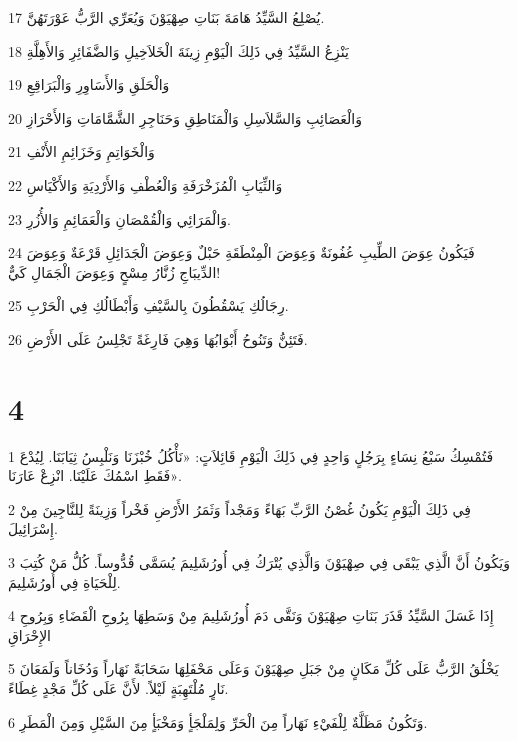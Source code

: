 \par 17 يُصْلِعُ السَّيِّدُ هَامَةَ بَنَاتِ صِهْيَوْنَ وَيُعَرِّي الرَّبُّ عَوْرَتَهُنَّ.
\par 18 يَنْزِعُ السَّيِّدُ فِي ذَلِكَ الْيَوْمِ زِينَةَ الْخَلاَخِيلِ وَالضَّفَائِرِ وَالأَهِلَّةِ
\par 19 وَالْحَلَقِ وَالأَسَاوِرِ وَالْبَرَاقِعِ
\par 20 وَالْعَصَائِبِ وَالسَّلاَسِلِ وَالْمَنَاطِقِ وَحَنَاجِرِ الشَّمَّامَاتِ وَالأَحْرَازِ
\par 21 وَالْخَوَاتِمِ وَخَزَائِمِ الأَنْفِ
\par 22 وَالثِّيَابِ الْمُزَخْرَفَةِ وَالْعُطْفِ وَالأَرْدِيَةِ وَالأَكْيَاسِ
\par 23 وَالْمَرَائِي وَالْقُمْصَانِ وَالْعَمَائِمِ وَالأُزُرِ.
\par 24 فَيَكُونُ عِوَضَ الطِّيبِ عُفُونَةٌ وَعِوَضَ الْمِنْطَقَةِ حَبْلٌ وَعِوَضَ الْجَدَائِلِ قَرْعَةٌ وَعِوَضَ الدِّيبَاجِ زُنَّارُ مِسْحٍ وَعِوَضَ الْجَمَالِ كَيٌّ!
\par 25 رِجَالُكِ يَسْقُطُونَ بِالسَّيْفِ وَأَبْطَالُكِ فِي الْحَرْبِ.
\par 26 فَتَئِنُّ وَتَنُوحُ أَبْوَابُهَا وَهِيَ فَارِغَةً تَجْلِسُ عَلَى الأَرْضِ.

\chapter{4}

\par 1 فَتُمْسِكُ سَبْعُ نِسَاءٍ بِرَجُلٍ وَاحِدٍ فِي ذَلِكَ الْيَوْمِ قَائِلاَتٍ: «نَأْكُلُ خُبْزَنَا وَنَلْبِسُ ثِيَابَنَا. لِيُدْعَ فَقَطِ اسْمُكَ عَلَيْنَا. انْزِعْ عَارَنَا».
\par 2 فِي ذَلِكَ الْيَوْمِ يَكُونُ غُصْنُ الرَّبِّ بَهَاءً وَمَجْداً وَثَمَرُ الأَرْضِ فَخْراً وَزِينَةً لِلنَّاجِينَ مِنْ إِسْرَائِيلَ.
\par 3 وَيَكُونُ أَنَّ الَّذِي يَبْقَى فِي صِهْيَوْنَ وَالَّذِي يُتْرَكُ فِي أُورُشَلِيمَ يُسَمَّى قُدُّوساً. كُلُّ مَنْ كُتِبَ لِلْحَيَاةِ فِي أُورُشَلِيمَ.
\par 4 إِذَا غَسَلَ السَّيِّدُ قَذَرَ بَنَاتِ صِهْيَوْنَ وَنَقَّى دَمَ أُورُشَلِيمَ مِنْ وَسَطِهَا بِرُوحِ الْقَضَاءِ وَبِرُوحِ الإِحْرَاقِ
\par 5 يَخْلُقُ الرَّبُّ عَلَى كُلِّ مَكَانٍ مِنْ جَبَلِ صِهْيَوْنَ وَعَلَى مَحْفَلِهَا سَحَابَةً نَهَاراً وَدُخَاناً وَلَمَعَانَ نَارٍ مُلْتَهِبَةٍ لَيْلاً. لأَنَّ عَلَى كُلِّ مَجْدٍ غِطَاءً.
\par 6 وَتَكُونُ مَظَلَّةٌ لِلْفَيْءِ نَهَاراً مِنَ الْحَرِّ وَلِمَلْجَأٍ وَمَخْبَأٍ مِنَ السَّيْلِ وَمِنَ الْمَطَرِ.


